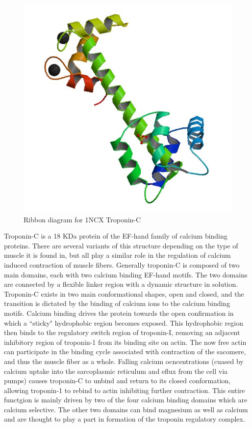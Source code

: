 \documentclass[12pt]{article}
\begin{document}
\begin{figure}[H]
	\centering
	\includegraphics[width=.95\linewidth]{ncx.png}
	
	\caption{Ribbon diagram for 1NCX Troponin-C}
	\label{struct}
\end{figure}

Troponin-C is a 18 KDa  protein of the EF-hand family of calcium binding proteins. There are several variants of this structure depending on the type of muscle it is found in, but all play a similar role in the regulation of calcium induced contraction of muscle fibers. Generally troponin-C is composed of two main domains, each with two calcium binding EF-hand motifs. The two domains are connected by a flexible linker region with a dynamic structure in solution. Troponin-C exists in two main conformational shapes, open and closed, and the transition is dictated by the binding of calcium ions to the calcium binding motifs. Calcium binding drives the protein towards the open confirmation in which a ``sticky" hydrophobic region becomes exposed. This hydrophobic region then binds to the regulatory switch region of troponin-I, removing an adjacent inhibitory region of troponin-1 from its binding site on actin. The now free actin can participate in the binding cycle associated with contraction of the sacomere, and thus the muscle fiber as a whole. Falling calcium ocncentrations (cuased by calcium uptake into the sarcoplasmic reticulum and eflux from the cell via pumps) causes troponin-C to unbind and return to its closed conformation, allowing troponin-1 to rebind to actin inhibiting further contraction. This entire functgion is mainly driven by two of the four calcium binding domains which are calcium selective. The other two domains can bind magnesium as well as calcium and are thought to play a part in formation of the troponin regulatory complex.
\end{document}
